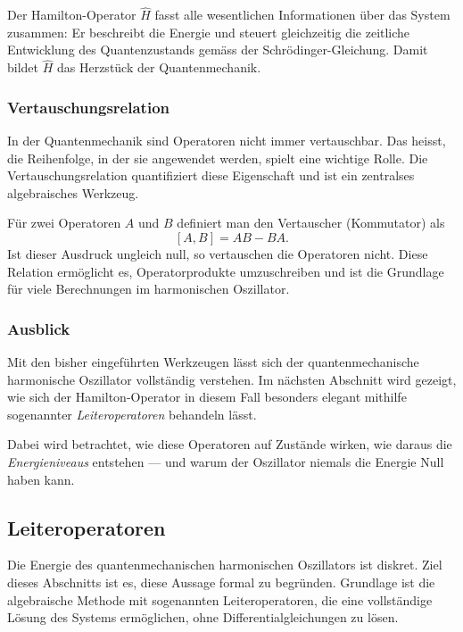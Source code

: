 		Der Hamilton-Operator $\hat{H}$ fasst alle wesentlichen Informationen über das System zusammen:
		Er beschreibt die Energie und steuert gleichzeitig die zeitliche Entwicklung des Quantenzustands gemäss der Schrödinger-Gleichung.
		Damit bildet $\hat{H}$ das Herzstück der Quantenmechanik.

	\subsubsection{Vertauschungsrelation\label{fourier:subsubsection:Vertauschungsrelation}}
		In der Quantenmechanik sind Operatoren nicht immer vertauschbar.
		Das heisst, die Reihenfolge, in der sie angewendet werden, spielt eine wichtige Rolle.
		Die Vertauschungsrelation quantifiziert diese Eigenschaft und ist ein zentralses algebraisches Werkzeug.

		Für zwei Operatoren $A$ und $B$ definiert man den Vertauscher (Kommutator) als
		\begin{equation}\label{fourier:equation:Vertauschungsrelation}
			[A, B] = AB - BA.
		\end{equation}
		Ist dieser Ausdruck ungleich null, so vertauschen die Operatoren nicht.
		Diese Relation ermöglicht es, Operatorprodukte umzuschreiben und ist die Grundlage für viele Berechnungen im harmonischen Oszillator.

	\subsubsection{Ausblick\label{fourier:subsubsection:Ausblick}}
		Mit den bisher eingeführten Werkzeugen lässt sich der quantenmechanische harmonische Oszillator vollständig verstehen.
		Im nächsten Abschnitt wird gezeigt, wie sich der Hamilton-Operator in diesem Fall besonders elegant mithilfe sogenannter \emph{Leiteroperatoren} behandeln lässt.

		Dabei wird betrachtet, wie diese Operatoren auf Zustände wirken, wie daraus die \emph{Energieniveaus} entstehen ---
		und warum der Oszillator niemals die Energie Null haben kann.

	\subsection{Leiteroperatoren\label{fourier:subsection:Leiteroperatoren}}
		Die Energie des quantenmechanischen harmonischen Oszillators ist diskret.
		Ziel dieses Abschnitts ist es, diese Aussage formal zu begründen.
		Grundlage ist die algebraische Methode mit sogenannten Leiteroperatoren, die eine vollständige Lösung des Systems ermöglichen, ohne Differentialgleichungen zu lösen.	

